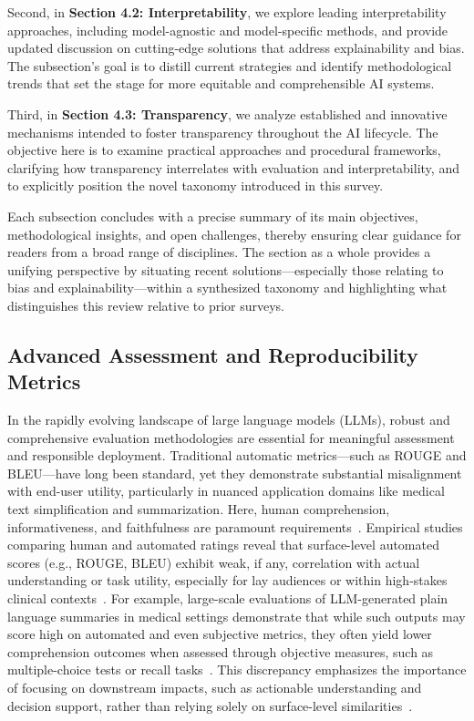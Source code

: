 \documentclass[sigconf]{acmart}
\begin{document}
Second, in \textbf{Section 4.2: Interpretability}, we explore leading interpretability approaches, including model-agnostic and model-specific methods, and provide updated discussion on cutting-edge solutions that address explainability and bias. The subsection’s goal is to distill current strategies and identify methodological trends that set the stage for more equitable and comprehensible AI systems.

Third, in \textbf{Section 4.3: Transparency}, we analyze established and innovative mechanisms intended to foster transparency throughout the AI lifecycle. The objective here is to examine practical approaches and procedural frameworks, clarifying how transparency interrelates with evaluation and interpretability, and to explicitly position the novel taxonomy introduced in this survey.

Each subsection concludes with a precise summary of its main objectives, methodological insights, and open challenges, thereby ensuring clear guidance for readers from a broad range of disciplines. The section as a whole provides a unifying perspective by situating recent solutions—especially those relating to bias and explainability—within a synthesized taxonomy and highlighting what distinguishes this review relative to prior surveys.


\subsection{Advanced Assessment and Reproducibility Metrics}

In the rapidly evolving landscape of large language models (LLMs), robust and comprehensive evaluation methodologies are essential for meaningful assessment and responsible deployment. Traditional automatic metrics—such as ROUGE and BLEU—have long been standard, yet they demonstrate substantial misalignment with end-user utility, particularly in nuanced application domains like medical text simplification and summarization. Here, human comprehension, informativeness, and faithfulness are paramount requirements~\cite{ref76, ref91, ref94, ref106, ref108}. Empirical studies comparing human and automated ratings reveal that surface-level automated scores (e.g., ROUGE, BLEU) exhibit weak, if any, correlation with actual understanding or task utility, especially for lay audiences or within high-stakes clinical contexts~\cite{ref81, ref94, ref95, ref101, ref104, ref108}. For example, large-scale evaluations of LLM-generated plain language summaries in medical settings demonstrate that while such outputs may score high on automated and even subjective metrics, they often yield lower comprehension outcomes when assessed through objective measures, such as multiple-choice tests or recall tasks~\cite{ref81}. This discrepancy emphasizes the importance of focusing on downstream impacts, such as actionable understanding and decision support, rather than relying solely on surface-level similarities~\cite{ref81, ref94}.
\end{document}
